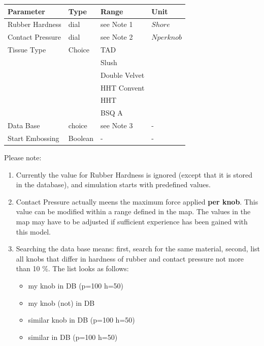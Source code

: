 \vspace{0.5cm}
\begin{tabular}{|l|l|l|l|} \hline
Parameter 		& Type 		& Range 	& Unit	         \\ \hline
Rubber Hardness  	& dial		& see Note 1 	& \symbol{23} $Shore$ \\ \hline
Contact Pressure	& dial		& see Note 2 	& $N per knob$ 	 \\ \hline
Tissue Type      	& Choice 	& TAD		&		 \\ 
			& 		& Slush 	&		 \\
			& 		& Double Velvet &		 \\				
			& 		& HHT Convent	& 		 \\ 
			&		& HHT      	& 		 \\ 
			& 		& BSQ A 	& 		 \\ \hline
Data Base		& choice	& see Note 3	& - 		 \\ \hline
Start Embossing     	& Boolean   	& -             & -              \\ \hline
\end{tabular}
\vspace{0.5cm}


Please note: 
\begin{enumerate}

\item Currently the value for Rubber Hardness is ignored (except that it is stored in the database), 
and simulation starts with predefined values.

\item Contact Pressure actually meens the maximum force applied {\bf per knob}. This value
can be modified within a range defined in the map. The values in the map may have to be
adjusted if sufficient experience has been gained with this model. 
  
\item Searching the data base means: first, search for the same material, 
second, list all knobs that differ in hardness of rubber and contact pressure 
not more than 10 \%.\newline
The list looks as follows:
	\begin{itemize}
	\item my knob in DB (p=100 h=50)
	\item my knob (not) in DB
	\item similar knob in DB (p=100 h=50)
	\item similar in DB (p=100 h=50)
	\end{itemize}
\end{enumerate}

